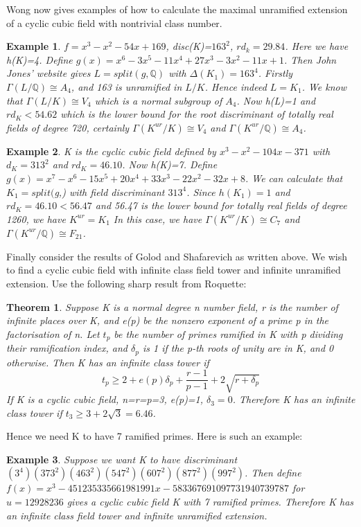 \documentclass[preprint,12pt,reqno]{elsarticle}
\newtheorem{theorem}{Theorem}
\newtheorem{example}{Example}
\begin{document}
Wong now gives examples of how to calculate the maximal unramified extension of a cyclic cubic field with nontrivial class number. \begin{example}
    $f=x^3-x^2-54x+169$, disc(K)=$163^2$, $rd_{k}=29.84$. Here we have h(K)=4. Define $g(x)=x^6-3x^5-11x^4+27x^3-3x^2-11x+1$. Then John Jones' website gives $L = split(g,\mathbb{Q})$ with $\Delta(K_1)=163^4$. Firstly $\Gamma(L/\mathbb{Q}) \cong A_4$, and 163 is unramified in $L/K$. Hence indeed $L=K_1$. We know that $\Gamma(L/K)\cong V_4$ which is a normal subgroup of $A_4$. Now h(L)=1 and $rd_K < 54.62$ which is the lower bound for the root discriminant of totally real fields of degree 720, certainly $\Gamma(K^{ur}/K) \cong V_4$ and $\Gamma(K^{ur}/\mathbb{Q}) \cong A_4$. 
\end{example}
\begin{example}
K is the cyclic cubic field defined by $x^3-x^2-104x-371$ with $d_K = 313^2$
and $rd_{K} = 46.10$. Now h(K)=7. Define $g(x) = x^7-x^6-15x^5+20x^4+33x^3-22x^2-32x+8$. We can calculate that $K_1=split($g,) with field discriminant $313^4$. Since $h(K_1) = 1$ and $rd_K = 46.10 < 56.47$ and 56.47 is the lower
bound for totally real fields of degree 1260, we have $K^{ur}=K_1$ In this
case, we have $\Gamma(K^{ur}/K) \cong C_7$ and $\Gamma(K^{ur}/\mathbb{Q}) \cong F_{21} $.  
\end{example}
Finally consider the results of Golod and Shafarevich as written above. We wish to find a cyclic cubic field with infinite class field tower and infinite unramified extension. Use the following sharp result from Roquette:
\begin{theorem}
    Suppose K is a normal degree n number field, r is the number of infinite places over K, and e(p) be the nonzero exponent of a prime p in the factorisation of n. Let $t_p$ be the number of primes ramified in K with p dividing their ramification index, and $\delta_p$ is 1 if the p-th roots of unity are in K, and 0 otherwise. Then K has an infinite class tower if \begin{equation}
        t_p\geqslant 2 + e(p)\delta_p + \frac{r-1}{p-1} + 2 \sqrt{r+\delta_p}
    \end{equation}
 If K is a cyclic cubic field,  n=r=p=3, e(p)=1, $\delta_3 = 0$. Therefore K has an infinite class tower if $t_3 \geq 3 + 2\sqrt{3} = 6.46$. 
\end{theorem}
Hence we need K to have 7 ramified primes. Here is such an example:
\begin{example}
    Suppose we want K to have discriminant $(3^4)(373^2)(463^2)(547^2)(607^2)(877^2)(997^2)$. Then define $f(x) = x^3 -451235335661981991x-583367691097731940739787$ for $u=12928236$ gives a cyclic cubic field K with 7 ramified primes. Therefore K has an infinite class field tower and infinite unramified extension. 
\end{example}
\end{document}
